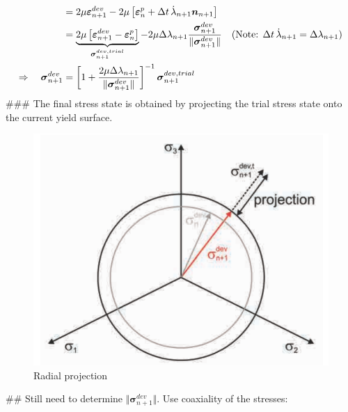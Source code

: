 \documentclass[]{scrartcl}
\begin{document}
\begin{easylist}
\begin{align*}
 &= 2 \mu  \boldsymbol{\varepsilon}^{dev}_{n+1} 
  - 2 \mu \left[ \boldsymbol{\varepsilon}^{p}_{n}
  + \Delta t \, \dot{\lambda}_{n+1} \boldsymbol{n}_{n+1} \right] \\
 &= \underbrace{2 \mu \left[ \boldsymbol{\varepsilon}^{dev}_{n+1} - \boldsymbol{\varepsilon}^{p}_{n} \right]}_{\boldsymbol{\sigma}^{dev, trial}_{n+1}}
  - 2 \mu \Delta \lambda_{n+1} \dfrac{\boldsymbol{\sigma}^{dev}_{n+1}}{\Vert \boldsymbol{\sigma}^{dev}_{n+1} \Vert} 
\quad (\textnormal{Note: } \Delta t \, \dot{\lambda}_{n+1} = \Delta \lambda_{n+1})
\\
\Rightarrow \quad
\boldsymbol{\sigma}^{dev}_{n+1}
 &= \left[ 1 + \dfrac{2 \mu \Delta \lambda_{n+1}}{\Vert \boldsymbol{\sigma}^{dev}_{n+1} \Vert} \right]^{-1} \boldsymbol{\sigma}^{dev, trial}_{n+1} 
\end{align*}
\clearpage
### The final stress state is obtained by projecting the trial stress state onto the current yield surface.
\begin{figure}[!htb]
\centering
\includegraphics[width=0.7\linewidth]{Figures/Sec_3_5_1-Radial_projection}
\caption{Radial projection \citep{Mergheim2018a}}
\label{fig:sec351-radialprojection}
\end{figure}
## Still need to determine $\Vert \boldsymbol{\sigma}^{dev}_{n+1} \Vert$. Use coaxiality of the stresses:
\begin{gather*}

\end{gather*}
\end{easylist}
\end{document}
